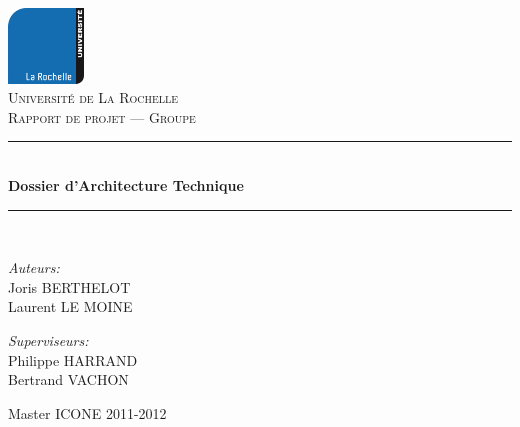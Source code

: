 \newcommand{\HRule}{\rule{\linewidth}{0.5mm}}

\begin{titlepage}

\begin{center}


\includegraphics[width=0.15\textwidth]{content/logo.png}\\[1cm]

\textsc{\LARGE Universit\'e de La Rochelle}\\[1.5cm]

\textsc{\Large Rapport de projet --- Groupe }\\[0.5cm]


\HRule \\[0.4cm]
{ \huge \bfseries Dossier d'Architecture Technique}\\[0.4cm]

\HRule \\[1.5cm]

\begin{minipage}{0.4\textwidth}
    \begin{flushleft} \large
        \emph{Auteurs:}\\
        Joris \textsc{BERTHELOT}\\
        Laurent \textsc{LE MOINE}
    \end{flushleft}
\end{minipage}
\begin{minipage}{0.4\textwidth}
    \begin{flushright} \large
        \emph{Superviseurs:} \\
        Philippe \textsc{HARRAND}\\
        Bertrand \textsc{VACHON}
    \end{flushright}
\end{minipage}

\vfill

{Master ICONE 2011-2012}

\end{center}

\end{titlepage}